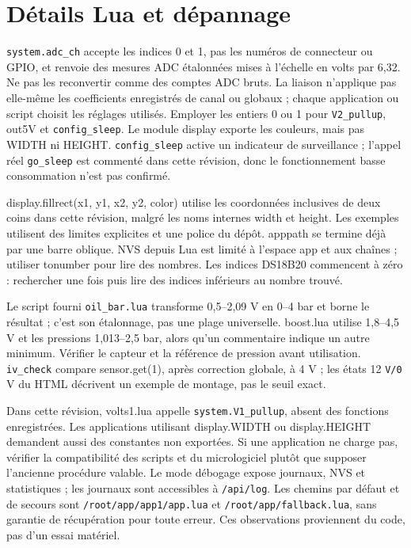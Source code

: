 \section{Détails Lua et dépannage}
\nolinkurl{system.adc_ch} accepte les indices 0 et 1, pas les numéros de connecteur ou GPIO, et renvoie des mesures ADC étalonnées mises à l'échelle en volts par 6,32. Ne pas les reconvertir comme des comptes ADC bruts. La liaison n'applique pas elle-même les coefficients enregistrés de canal ou globaux ; chaque application ou script choisit les réglages utilisés. Employer les entiers 0 ou 1 pour \nolinkurl{V2_pullup}, out5V et \nolinkurl{config_sleep}. Le module display exporte les couleurs, mais pas WIDTH ni HEIGHT. \nolinkurl{config_sleep} active un indicateur de surveillance ; l’appel réel \nolinkurl{go_sleep} est commenté dans cette révision, donc le fonctionnement basse consommation n’est pas confirmé.

display.fillrect(x1, y1, x2, y2, color) utilise les coordonnées inclusives de deux coins dans cette révision, malgré les noms internes width et height. Les exemples utilisent des limites explicites et une police du dépôt. apppath se termine déjà par une barre oblique. NVS depuis Lua est limité à l'espace app et aux chaînes ; utiliser tonumber pour lire des nombres. Les indices DS18B20 commencent à zéro : rechercher une fois puis lire des indices inférieurs au nombre trouvé.

Le script fourni \nolinkurl{oil_bar.lua} transforme 0,5–2,09 V en 0–4 bar et borne le résultat ; c'est son étalonnage, pas une plage universelle. boost.lua utilise 1,8–4,5 V et les pressions 1,013–2,5 bar, alors qu'un commentaire indique un autre minimum. Vérifier le capteur et la référence de pression avant utilisation. \nolinkurl{iv_check} compare sensor.get(1), après correction globale, à 4 V ; les états 12 \nolinkurl{V/0} V du HTML décrivent un exemple de montage, pas le seuil exact.

Dans cette révision, volts1.lua appelle \nolinkurl{system.V1_pullup}, absent des fonctions enregistrées. Les applications utilisant display.WIDTH ou display.HEIGHT demandent aussi des constantes non exportées. Si une application ne charge pas, vérifier la compatibilité des scripts et du micrologiciel plutôt que supposer l'ancienne procédure valable. Le mode débogage expose journaux, NVS et statistiques ; les journaux sont accessibles à \nolinkurl{/api/log}. Les chemins par défaut et de secours sont \nolinkurl{/root/app/app1/app.lua} et \nolinkurl{/root/app/fallback.lua}, sans garantie de récupération pour toute erreur. Ces observations proviennent du code, pas d'un essai matériel.

